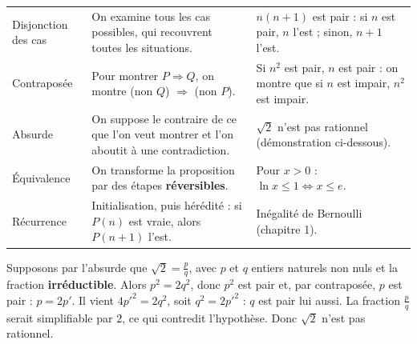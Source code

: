 {\renewcommand{\arraystretch}{1.5}%
\begin{tabularx}{\linewidth}{@{}>{\leavevmode\color{otNavy}\otSemi\fontsize{8}{10}\selectfont}p{29mm}YY@{}}
\toprule
 &  &  \\
\midrule
Disjonction des cas & On examine tous les cas possibles, qui recouvrent toutes les situations. &
  $n(n+1)$ est pair : si $n$ est pair, $n$ l'est ; sinon, $n+1$ l'est. \\
Contraposée & Pour montrer $P\Rightarrow Q$, on montre (non $Q$) $\Rightarrow$ (non $P$). &
  Si $n^{2}$ est pair, $n$ est pair : on montre que si $n$ est impair, $n^{2}$ est impair. \\
Absurde & On suppose le contraire de ce que l'on veut montrer et l'on aboutit à une contradiction. &
  $\sqrt2$ n'est pas rationnel (démonstration ci-dessous). \\
Équivalence & On transforme la proposition par des étapes \textbf{réversibles}. &
  Pour $x>0$ : $\ln x\leq1\iff x\leq e$. \\
Récurrence & Initialisation, puis hérédité : si $P(n)$ est vraie, alors $P(n+1)$ l'est. &
  Inégalité de Bernoulli (chapitre 1). \\
\bottomrule
\end{tabularx}}

\begin{demonstration}
Supposons par l'absurde que $\sqrt2=\frac pq$, avec $p$ et $q$ entiers naturels non nuls et la fraction \textbf{irréductible}.
Alors $p^{2}=2q^{2}$, donc $p^{2}$ est pair et, par contraposée, $p$ est pair : $p=2p'$. Il vient $4p'^{2}=2q^{2}$, soit
$q^{2}=2p'^{2}$ : $q$ est pair lui aussi. La fraction $\frac pq$ serait simplifiable par $2$, ce qui contredit l'hypothèse.
Donc $\sqrt2$ n'est pas rationnel.
\end{demonstration}


